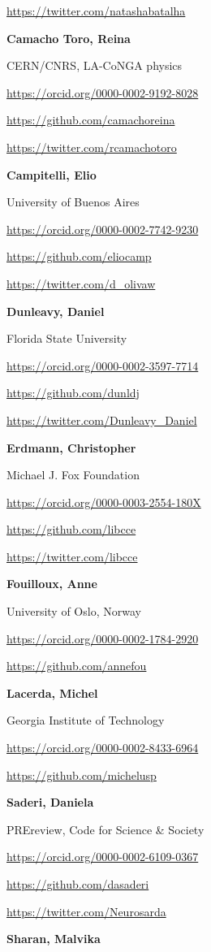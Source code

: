 \documentclass[
  letterpaper,
  DIV=11,
  numbers=noendperiod]{scrreport}
\begin{document}
\url{https://twitter.com/natashabatalha}

\textbf{Camacho Toro, Reina}

CERN/CNRS, LA-CoNGA physics

\url{https://orcid.org/0000-0002-9192-8028}

\url{https://github.com/camachoreina}

\url{https://twitter.com/rcamachotoro}

\textbf{Campitelli, Elio}

University of Buenos Aires

\url{https://orcid.org/0000-0002-7742-9230}

\url{https://github.com/eliocamp}

\url{https://twitter.com/d_olivaw}

\textbf{Dunleavy, Daniel}

Florida State University

\url{https://orcid.org/0000-0002-3597-7714}

\url{https://github.com/dunldj}

\url{https://twitter.com/Dunleavy_Daniel}

\textbf{Erdmann, Christopher}

Michael J. Fox Foundation

\url{https://orcid.org/0000-0003-2554-180X}

\url{https://github.com/libcce}

\url{https://twitter.com/libcce}

\textbf{Fouilloux, Anne}

University of Oslo, Norway

\url{https://orcid.org/0000-0002-1784-2920}

\url{https://github.com/annefou}

\textbf{Lacerda, Michel}

Georgia Institute of Technology

\url{https://orcid.org/0000-0002-8433-6964}

\url{https://github.com/michelusp}

\textbf{Saderi, Daniela}

PREreview, Code for Science \& Society

\href{}{https://orcid.org/0000-0002-6109-0367}

\url{https://github.com/dasaderi}

\url{https://twitter.com/Neurosarda}

\textbf{Sharan, Malvika}
\end{document}
